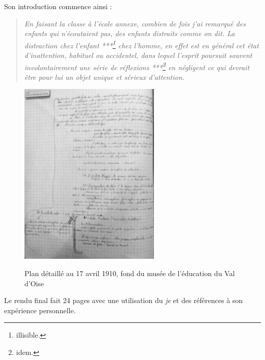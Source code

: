 \documentclass[a4paper,11pt]{article}
\begin{document}
			  Son introduction commence ainsi : 
			  \begin{quote}
			  \emph{En faisant la classe à l'école annexe, combien de fois j'ai remarqué des enfants qui n'écoutaient pas, des enfants distraits comme on dit. La distraction chez l'enfant ***\footnote{illisible.} chez l'homme, en effet est en général cet état d'inattention, habituel ou accidentel, dans lequel l'esprit poursuit souvent involontairement une série de réflexions ***\footnote{idem.} en négligent ce qui devrait être pour lui un objet unique et sérieux d'attention.}
			  \end{quote}
			  \begin{figure}[!h]
			    \centering
			    \includegraphics[width=0.6\textwidth]{plan.png}\\
			    \caption{Plan détaillé au 17 avril 1910, fond du musée de l'éducation du Val d'Oise}
			    \label{fig. 6}
			  \end{figure}
			  Le rendu final fait 24 pages avec une utilisation du \emph{je} et des références à son expérience personnelle.
\end{document}

